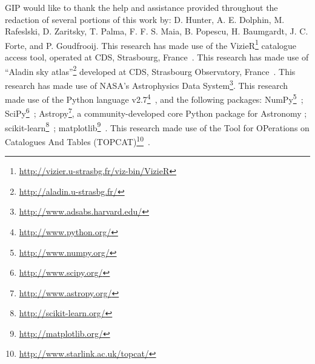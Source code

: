 \documentclass{aa}
\begin{document}
\begin{acknowledgements}
GIP would like to thank the help and assistance provided throughout the
redaction of several portions of this work by: D. Hunter, A. E. Dolphin,
M. Rafeslski, D. Zaritsky, T. Palma, F. F. S. Maia, B. Popescu,
H. Baumgardt, J. C. Forte, and P. Goudfrooij.
%
This research has made use of the
VizieR\footnote{\url{http://vizier.u-strasbg.fr/viz-bin/VizieR}} catalogue
access tool, operated at CDS, Strasbourg, France~\citep{Ochsenbein_2000}.
%
This research has made use of
``Aladin sky atlas''\footnote{\url{http://aladin.u-strasbg.fr/}} developed at
CDS, Strasbourg Observatory, France~\citep{Bonnarel2000,Boch2014}.
%
This research has made use of NASA's Astrophysics Data
System\footnote{\url{http://www.adsabs.harvard.edu/}}.
%
This research made use of
the Python language v2.7\footnote{\url{http://www.python.org/}}~\citep
{vanRossum_1995},
and the following packages:
NumPy\footnote{\url{http://www.numpy.org/}}~\citep{vanDerWalt_2011};
SciPy\footnote{\url{http://www.scipy.org/}}~\citep{Jones_2001};
Astropy\footnote{\url{http://www.astropy.org/}}, a community-developed core Python
package for Astronomy \citep{Astropy_2013};
scikit-learn\footnote{\url{http://scikit-learn.org/}}~\citep{pedregosa_2011};
matplotlib\footnote{\url{http://matplotlib.org/}}~\citep{hunter_2007}.
%
This research made use of the Tool for OPerations on Catalogues And
Tables (TOPCAT)\footnote{\url{http://www.starlink.ac.uk/topcat/}}~\citep{Taylor_2005}.
\end{acknowledgements}





\end{document}
